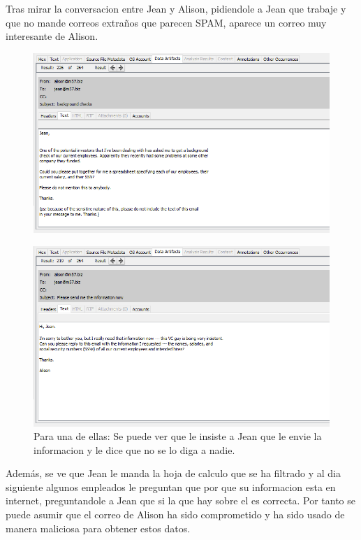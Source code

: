 \documentclass{article}
\begin{document}
Tras mirar la conversacion entre Jean y Alison, pidiendole a Jean que trabaje y que no mande correos extraños que parecen SPAM, aparece un correo muy interesante de Alison.

\begin{figure}[H]
    \centering
    \includegraphics[width=\textwidth]{imagenes/Windows/Captura de pantalla (9).png}
\end{figure}

\begin{figure}[H]
    \centering
    \includegraphics[width=\textwidth]{imagenes/Windows/Captura de pantalla (10).png}
    \caption{Para una de ellas: Se puede ver que le insiste a Jean que le envie la informacion y le dice que no se lo diga a nadie.}
\end{figure}

Además, se ve que Jean le manda la hoja de calculo que se ha filtrado y al dia siguiente algunos empleados le preguntan que por que su informacion esta en internet, preguntandole a Jean que si la que hay sobre el es correcta. Por tanto se puede asumir que el correo de Alison ha sido comprometido y ha sido usado de manera maliciosa para obtener estos datos.
\end{document}
